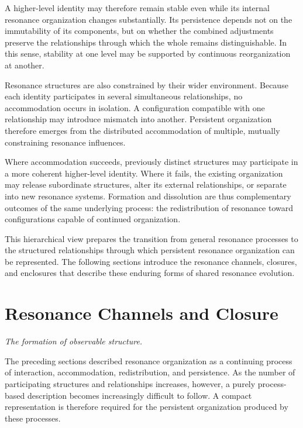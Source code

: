 \documentclass[11pt,a4paper]{article}
\begin{document}
A higher-level identity may therefore remain stable even while its internal resonance organization changes substantially. Its persistence depends not on the immutability of its components, but on whether the combined adjustments preserve the relationships through which the whole remains distinguishable. In this sense, stability at one level may be supported by continuous reorganization at another.

Resonance structures are also constrained by their wider environment. Because each identity participates in several simultaneous relationships, no accommodation occurs in isolation. A configuration compatible with one relationship may introduce mismatch into another. Persistent organization therefore emerges from the distributed accommodation of multiple, mutually constraining resonance influences.

Where accommodation succeeds, previously distinct structures may participate in a more coherent higher-level identity. Where it fails, the existing organization may release subordinate structures, alter its external relationships, or separate into new resonance systems. Formation and dissolution are thus complementary outcomes of the same underlying process: the redistribution of resonance toward configurations capable of continued organization.

This hierarchical view prepares the transition from general resonance processes to the structured relationships through which persistent resonance organization can be represented. The following sections introduce the resonance channels, closures, and enclosures that describe these enduring forms of shared resonance evolution.






\section{Resonance Channels and Closure}

\emph{The formation of observable structure.}
\vspace{0.6em} 

The preceding sections described resonance organization as a continuing process of interaction, accommodation, redistribution, and persistence. As the number of participating structures and relationships increases, however, a purely process-based description becomes increasingly difficult to follow. A compact representation is therefore required for the persistent organization produced by these processes.
\end{document}

